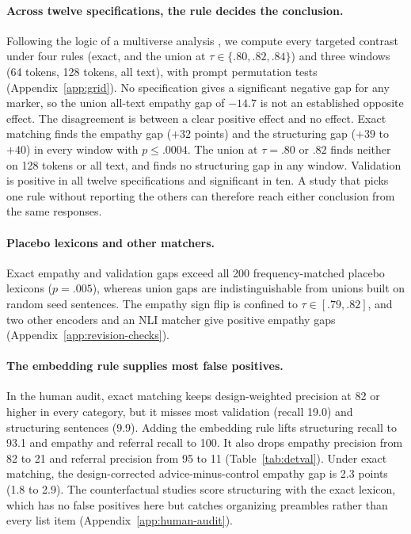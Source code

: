 \documentclass[11pt]{article}
\begin{document}
\paragraph{Across twelve specifications, the rule decides the conclusion.}
Following the logic of a multiverse analysis \citep{steegen2016multiverse},
we compute every targeted contrast under four rules (exact, and the union at
$\tau\in\{.80,.82,.84\}$) and three windows (64 tokens, 128 tokens, all
text), with prompt permutation tests (Appendix~\ref{app:grid}). No
specification gives a significant negative gap for any marker, so the union
all-text empathy gap of $-14.7$ is not an established opposite effect. The
disagreement is between a clear positive effect and no effect. Exact
matching finds the empathy gap ($+32$ points) and the structuring gap ($+39$
to $+40$) in every window with $p\leq.0004$. The union at $\tau=.80$ or
$.82$ finds neither on 128 tokens or all text, and finds no structuring gap
in any window. Validation is positive in all twelve specifications and
significant in ten. A study that picks one rule without reporting the others
can therefore reach either conclusion from the same responses.

\paragraph{Placebo lexicons and other matchers.}
Exact empathy and validation gaps exceed all 200 frequency-matched placebo
lexicons ($p=.005$), whereas union gaps are indistinguishable from unions
built on random seed sentences. The empathy sign flip is confined to
$\tau\in[.79,.82]$, and two other encoders and an NLI matcher give positive
empathy gaps (Appendix~\ref{app:revision-checks}).

\paragraph{The embedding rule supplies most false positives.}
In the human audit, exact matching keeps design-weighted precision at 82 or
higher in every category, but it misses most validation (recall 19.0) and
structuring sentences (9.9). Adding the embedding rule lifts structuring
recall to 93.1 and empathy and referral recall to 100. It also drops empathy
precision from 82 to 21 and referral precision from 95 to 11
(Table~\ref{tab:detval}). Under exact matching, the design-corrected
advice-minus-control empathy gap is 2.3 points (1.8 to 2.9). The
counterfactual studies score structuring with the exact lexicon, which has no
false positives here but catches organizing preambles rather than every list
item (Appendix~\ref{app:human-audit}).
\end{document}
